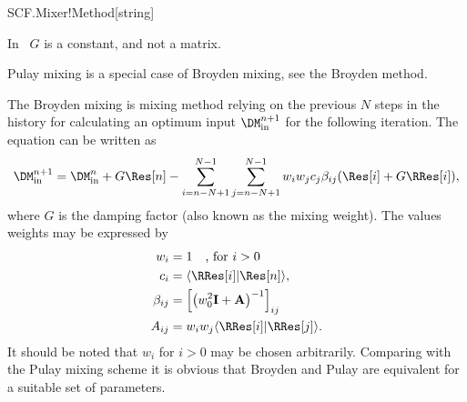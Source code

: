 \begin{fdfentry}{SCF.Mixer!Method}[string]
\begin{fdfoptions}
    In \siesta\ $G$ is a constant, and not a matrix.

    \note Pulay mixing is a special case of Broyden mixing, see the
    Broyden method.

    \option[Broyden] %
    The Broyden mixing is mixing method relying on the previous $N$
    steps in the history for calculating an optimum input
    $\DM^{n+1}_{\mathrm{in}}$ for the following iteration.  The
    equation can be written as
    \begin{equation}
      \DM^{n+1}_{\mathrm{in}} = \DM^n_{\mathrm{in}} + G \Res[n]
      - \sum_{i=n-N+1}^{N-1}\sum_{j=n-N+1}^{N-1} w_iw_j c_j \beta_{ij} (\Res[i] + G \RRes[i]),
    \end{equation}
    where $G$ is the damping factor (also known as
    the mixing weight).
    The values weights may be expressed by
    \begin{align}
      w_i &= 1 \quad\text{, for }i>0
      \\
      c_i &= \langle \RRes[i] | \Res[n] \rangle,
      \\
      \beta_{ij} &= \Big[\big(w_0^2\mathbf I + \mathbf
      A\big)^{-1}\Big]_{ij}
      \\
      A_{ij} &= w_iw_j \langle \RRes[i] | \RRes[j] \rangle.
    \end{align}
    It should be noted that $w_i$ for $i>0$ may be chosen arbitrarily.
    Comparing with the Pulay mixing scheme it is obvious that Broyden
    and Pulay are equivalent for a suitable set of parameters.

  \end{fdfoptions}
  
\end{fdfentry}

